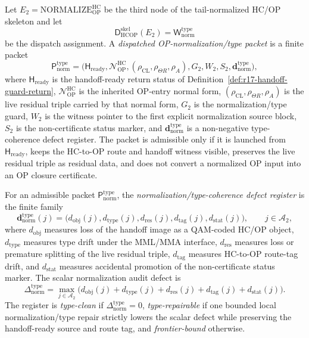 \begin{definition}
\label{def:dispatched-op-normalization-type-packet}
Let \(E_2=\mathrm{NORMALIZE}_{\mathrm{OP}}^{\mathrm{HC}}\) be the third node of the tail-normalized HC/OP skeleton and let
\[
 \mathsf D_{\mathrm{HCOP}}^{\mathrm{skel}}(E_2)
 =
 \mathsf W_{\mathrm{norm}}^{\mathrm{type}}
\]
be the dispatch assignment. A \emph{dispatched OP-normalization/type packet} is a finite packet
\[
 \mathsf P_{\mathrm{norm}}^{\mathrm{type}}
 =
 \bigl(\mathsf H_{\mathrm{ready}},\mathcal N_{\mathrm{OP}}^{\mathrm{HC}},
 (\rho_{\mathrm{CL}},\rho_{\Theta R},\rho_A),G_2,W_2,S_2,
 \mathbf d_{\mathrm{norm}}^{\mathrm{type}}\bigr),
\]
where \(\mathsf H_{\mathrm{ready}}\) is the handoff-ready return status of Definition~\ref{def:r17-handoff-guard-return}, \(\mathcal N_{\mathrm{OP}}^{\mathrm{HC}}\) is the inherited OP-entry normal form, \((\rho_{\mathrm{CL}},\rho_{\Theta R},\rho_A)\) is the live residual triple carried by that normal form, \(G_2\) is the normalization/type guard, \(W_2\) is the witness pointer to the first explicit normalization source block, \(S_2\) is the non-certificate status marker, and \(\mathbf d_{\mathrm{norm}}^{\mathrm{type}}\) is a non-negative type-coherence defect register. The packet is admissible only if it is launched from \(\mathsf H_{\mathrm{ready}}\), keeps the HC-to-OP route and handoff witness visible, preserves the live residual triple as residual data, and does not convert a normalized OP input into an OP closure certificate.
\end{definition}

\begin{definition}
\label{def:normalization-type-coherence-defect-register}
For an admissible packet \(\mathsf P_{\mathrm{norm}}^{\mathrm{type}}\), the \emph{normalization/type-coherence defect register} is the finite family
\[
 \mathbf d_{\mathrm{norm}}^{\mathrm{type}}(j)
 =
 \bigl(d_{\mathrm{obj}}(j),d_{\mathrm{type}}(j),d_{\mathrm{res}}(j),d_{\mathrm{tag}}(j),d_{\mathrm{stat}}(j)\bigr),
 \qquad j\in\mathcal A_2,
\]
where \(d_{\mathrm{obj}}\) measures loss of the handoff image as a QAM-coded HC/OP object, \(d_{\mathrm{type}}\) measures type drift under the MML/MMA interface, \(d_{\mathrm{res}}\) measures loss or premature splitting of the live residual triple, \(d_{\mathrm{tag}}\) measures HC-to-OP route-tag drift, and \(d_{\mathrm{stat}}\) measures accidental promotion of the non-certificate status marker. The scalar normalization audit defect is
\[
 \Delta_{\mathrm{norm}}^{\mathrm{type}}
 =
 \max_{j\in\mathcal A_2}
 \bigl(d_{\mathrm{obj}}(j)+d_{\mathrm{type}}(j)+d_{\mathrm{res}}(j)+d_{\mathrm{tag}}(j)+d_{\mathrm{stat}}(j)\bigr).
\]
The register is \emph{type-clean} if \(\Delta_{\mathrm{norm}}^{\mathrm{type}}=0\), \emph{type-repairable} if one bounded local normalization/type repair strictly lowers the scalar defect while preserving the handoff-ready source and route tag, and \emph{frontier-bound} otherwise.
\end{definition}

